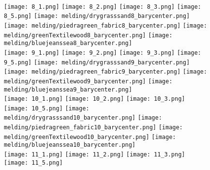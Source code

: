 \begin{figure}[ht!]
{ \\
\vspace{1mm}
    \texttt{[image: 8\_1.png]}
    \texttt{[image: 8\_2.png]}
    \texttt{[image: 8\_3.png]}
    \texttt{[image: 8\_5.png]}
    \hspace{2mm}
    \texttt{[image: melding/drygrasssand8\_barycenter.png]}
    \texttt{[image: melding/piedragreen\_fabric8\_barycenter.png]}
    \texttt{[image: melding/greenTextilewood8\_barycenter.png]}
    \texttt{[image: melding/bluejeanssea8\_barycenter.png]}
 \\
\vspace{1mm}
    \texttt{[image: 9\_1.png]}
    \texttt{[image: 9\_2.png]}
    \texttt{[image: 9\_3.png]}
    \texttt{[image: 9\_5.png]}
    \hspace{2mm}
    \texttt{[image: melding/drygrasssand9\_barycenter.png]}
    \texttt{[image: melding/piedragreen\_fabric9\_barycenter.png]}
    \texttt{[image: melding/greenTextilewood9\_barycenter.png]}
    \texttt{[image: melding/bluejeanssea9\_barycenter.png]}
 \\
\vspace{1mm}
    \texttt{[image: 10\_1.png]}
    \texttt{[image: 10\_2.png]}
    \texttt{[image: 10\_3.png]}
    \texttt{[image: 10\_5.png]}
    \hspace{2mm}
    \texttt{[image: melding/drygrasssand10\_barycenter.png]}
    \texttt{[image: melding/piedragreen\_fabric10\_barycenter.png]}
    \texttt{[image: melding/greenTextilewood10\_barycenter.png]}
    \texttt{[image: melding/bluejeanssea10\_barycenter.png]}
 \\
\vspace{1mm}
    \texttt{[image: 11\_1.png]}
    \texttt{[image: 11\_2.png]}
    \texttt{[image: 11\_3.png]}
    \texttt{[image: 11\_5.png]}
}
\end{figure}
